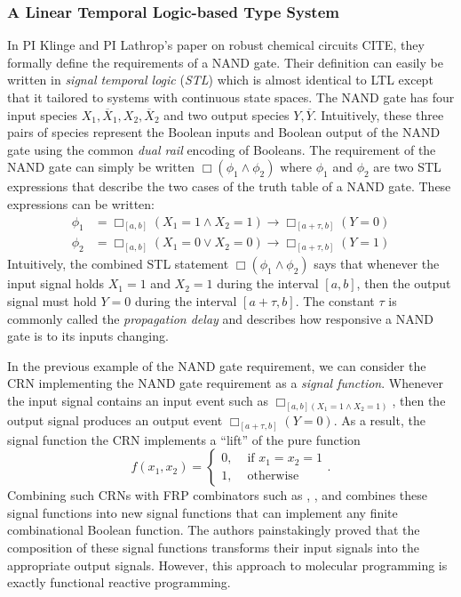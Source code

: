 \subsubsection{A Linear Temporal Logic-based Type System}

In PI Klinge and PI Lathrop's paper on robust chemical circuits CITE, they formally define the requirements of a NAND gate.
Their definition can easily be written in \emph{signal temporal logic} (\emph{STL}) which is almost identical to LTL except that it tailored to systems with continuous state spaces.
The NAND gate has four input species \( X_1, \overline{X}_1, X_2, \overline{X}_2  \) and two output species \( Y, \overline{Y} \).
Intuitively, these three pairs of species represent the Boolean inputs and Boolean output of the NAND gate using the common \emph{dual rail} encoding of Booleans.
The requirement of the NAND gate can simply be written \( \Box(\phi_1 \land \phi_2) \) where \( \phi_1 \) and \( \phi_2 \) are two STL expressions that describe the two cases of the truth table of a NAND gate.
These expressions can be written:
\begin{align*}
    \phi_1 &= \Box_{[a,b]} (X_1 = 1 \land X_2 = 1) \rightarrow \Box_{[a+\tau, b]} (Y = 0)\\
    \phi_2 &= \Box_{[a,b]} (X_1 = 0 \lor X_2 = 0)  \rightarrow \Box_{[a+\tau, b]} (Y = 1)
\end{align*}
Intuitively, the combined STL statement \( \Box(\phi_1 \land \phi_2) \) says that whenever the input signal holds \( X_1 = 1 \) and \( X_2 = 1 \) during the interval \( [a,b] \), then the output signal must hold \( Y = 0 \) during the interval \( [a+\tau, b] \).
The constant \( \tau \) is commonly called the \emph{propagation delay} and describes how responsive a NAND gate is to its inputs changing.

In the previous example of the NAND gate requirement, we can consider the CRN implementing the NAND gate requirement as a \emph{signal function}.
Whenever the input signal contains an input event such as \( \Box_{[a,b](X_1 = 1 \land X_2 = 1)} \), then the output signal produces an output event \( \Box_{[a+\tau, b]}(Y = 0) \).
As a result, the signal function the CRN implements a ``lift'' of the pure function
\[
    f(x_1, x_2) =
    \begin{cases}
        0, &\text{ if }x_1 = x_2 = 1\\
        1, &\text{ otherwise}
    \end{cases}.
\]
Combining such CRNs with FRP combinators such as \hask{>>>}, \hask{&&&}, and \hask{***} combines these signal functions into new signal functions that can implement any finite combinational Boolean function.
The authors painstakingly proved that the composition of these signal functions transforms their input signals into the appropriate output signals.
However, this approach to molecular programming is exactly functional reactive programming.

